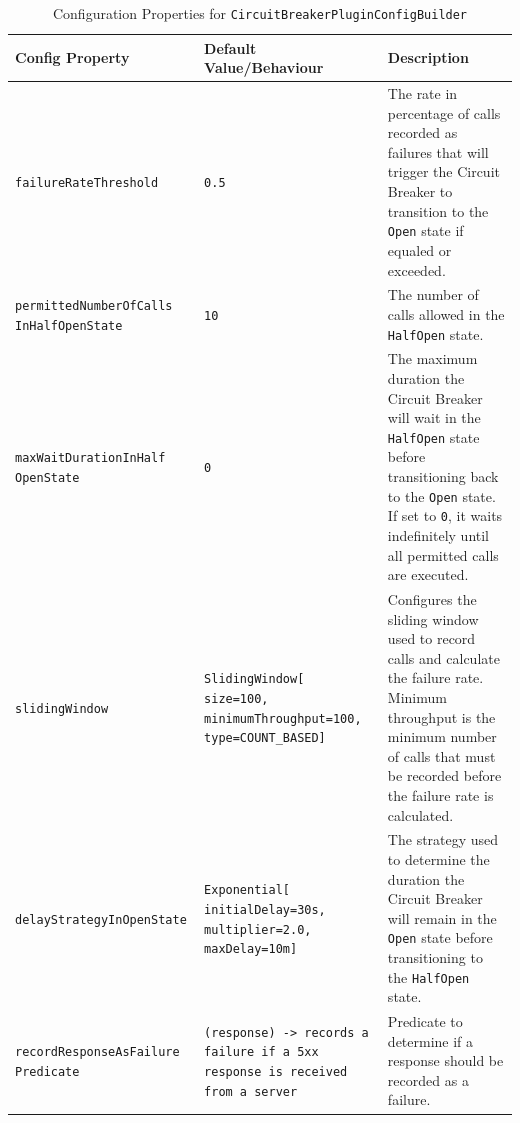 \begin{table}[!htb]
    \centering
    \caption{Configuration Properties for \texttt{CircuitBreakerPluginConfigBuilder}}
    \label{tab:circuit-breaker-config-builder}
    \vspace{0.3cm}
    \begin{tabular}{|p{5cm}|p{5cm}|p{6cm}|}
        \hline
        \textbf{Config Property}                   & \textbf{Default Value/Behaviour}                                                     & \textbf{Description}                                                                                                                                        \\ \hline
        \texttt{failureRateThreshold}              & \texttt{0.5}                                                                         & The rate in percentage of calls recorded as failures that will trigger the Circuit Breaker to transition to the \texttt{Open} state if equaled or exceeded. \\ \hline
        \texttt{permittedNumberOfCalls InHalfOpenState} & \texttt{10} & The number of calls
        allowed in the \texttt{HalfOpen} state. \\ \hline
        \texttt{maxWaitDurationInHalf OpenState} & \texttt{0} & The maximum duration
        the Circuit Breaker will wait in the \texttt{HalfOpen} state before transitioning back to the \texttt{Open} state.
        If set to \texttt{0}, it waits indefinitely until all permitted calls are executed. \\ \hline
        \texttt{slidingWindow} & \texttt{SlidingWindow[ size=100, minimumThroughput=100, type=COUNT\_BASED]}
        & Configures the sliding window used to record calls and calculate the failure rate.
        Minimum throughput is the minimum number of calls
        that must be recorded before the failure rate is calculated.
        \\ \hline
        \texttt{delayStrategyInOpenState}          & \texttt{Exponential[ initialDelay=30s, multiplier=2.0, maxDelay=10m]}     & The strategy used to determine the duration the Circuit Breaker will remain in the \texttt{Open} state before transitioning to the \texttt{HalfOpen} state. \\ \hline
        \texttt{recordResponseAsFailure Predicate} & \texttt{(response) -> records a failure if a 5xx response is received from a server}                               & Predicate to determine if a response should be recorded as a failure.                                   \\ \hline
    \end{tabular}
\end{table}

